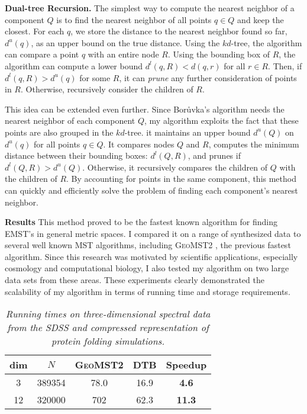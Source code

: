 \documentclass[twoside,leqno, 12pt]{article}
\begin{document}
\textbf{Dual-tree Recursion.}  The simplest way to compute the nearest neighbor of a component $Q$ is to find the nearest neighbor of all points $q \in Q$ and keep the closest.  For each $q$, we store the distance to the nearest neighbor found so far, $d^u(q)$, as an upper bound on the true distance.  Using the $kd$-tree, the algorithm can compare a point $q$ with an entire node $R$.  Using the bounding box of $R$, the algorithm can compute a lower bound $d^l(q, R) < d(q, r)$ for all $r \in R$.  Then, if $d^l(q, R) > d^u(q)$ for some $R$, it can \emph{prune} any further consideration of points in $R$.  Otherwise, recursively consider the children of $R$.

This idea can be extended even further.  Since Bor\r{u}vka's algorithm needs the nearest neighbor of each component $Q$, my algorithm exploits the fact that these points are also grouped in the $kd$-tree.  it maintains an upper bound $d^u(Q)$ on $d^u(q)$ for all points $q \in Q$.  It compares nodes $Q$ and $R$, computes the minimum distance between their bounding boxes: $d^l(Q,R)$, and prunes if $d^l(Q, R) > d^u(Q)$.  Otherwise, it recursively compares the children of $Q$ with the children of $R$.  By accounting for points in the same component, this method can quickly and efficiently solve the problem of finding each component's nearest neighbor.  



\textbf{Results}
This method proved to be the fastest known algorithm for finding EMST's in general metric spaces.  I compared it on a range of synthesized data to several well known MST algorithms, including \textsc{GeoMST2} \cite{narzhuzac:00}, the previous fastest algorithm.  Since this research was motivated by scientific applications, especially cosmology and computational biology, I also tested my algorithm on two large data sets from these areas.  These experiments clearly demonstrated the scalability of my algorithm in terms of running time and storage requirements.
\begin{wraptable}{r}{0.55\textwidth}
\vspace{-0.2in}
\begin{tabular}{|c|c|c|c|c|} \hline
dim & $N$ & \textsc{GeoMST2} & \textsc{DTB} & Speedup \\ \hline \hline
3 & 389354 & 78.0 & 16.9 & \textbf{4.6} \\ \hline 
12 & 320000 & 702 & 62.3 & \textbf{11.3} \\ \hline 
\end{tabular}
\vspace{-0.1in}
\caption{\emph{Running times on three-dimensional spectral data from the SDSS and compressed representation of protein folding simulations.}}
\end{wraptable}
\end{document}
